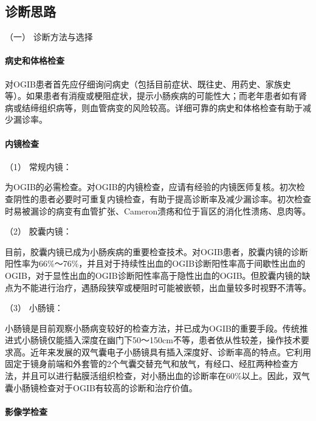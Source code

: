 \subsection{诊断思路}

\hypertarget{text00034.htmlux5cux23CHP1-13-3-1-1}{}
（一） 诊断方法与选择

\paragraph{病史和体格检查}

对OGIB患者首先应仔细询问病史（包括目前症状、既往史、用药史、家族史等）。如果患者有消瘦或梗阻症状，提示小肠疾病的可能性大；而老年患者如有肾病或结缔组织病等，则血管病变的风险较高。详细可靠的病史和体格检查有助于减少漏诊率。

\paragraph{内镜检查}

\hypertarget{text00034.htmlux5cux23CHP1-13-3-1-1-2-1}{}
（1） 常规内镜：

为OGIB的必需检查。对OGIB的内镜检查，应请有经验的内镜医师复核。初次检查阴性的患者必要时可重复内镜检查，有助于提高诊断率及减少漏诊率。初次检查时易被漏诊的病变有血管扩张、Cameron溃疡和位于盲区的消化性溃疡、息肉等。

\hypertarget{text00034.htmlux5cux23CHP1-13-3-1-1-2-2}{}
（2） 胶囊内镜：

目前，胶囊内镜已成为小肠疾病的重要检查技术。对OGIB患者，胶囊内镜的诊断阳性率为66\%～76\%，并且对于持续性出血的OGIB诊断阳性率高于间歇性出血的OGIB，对于显性出血的OGIB诊断阳性率高于隐性出血的OGIB。但胶囊内镜的缺点为不能进行治疗，遇肠段狭窄或梗阻时可能被嵌顿，出血量较多时视野不清等。

\hypertarget{text00034.htmlux5cux23CHP1-13-3-1-1-2-3}{}
（3） 小肠镜：

小肠镜是目前观察小肠病变较好的检查方法，并已成为OGIB的重要手段。传统推进式小肠镜仅能插入深度在幽门下50～150cm不等，患者依从性较差，操作技术要求高。近年来发展的双气囊电子小肠镜具有插入深度好、诊断率高的特点。它利用固定于镜身前端和外套管的2个气囊交替充气和放气，有经口、经肛两种检查方法，并且可以进行黏膜活组织检查，对小肠出血的诊断率在60\%以上。因此，双气囊小肠镜检查对于OGIB有较高的诊断和治疗价值。

\paragraph{影像学检查}

